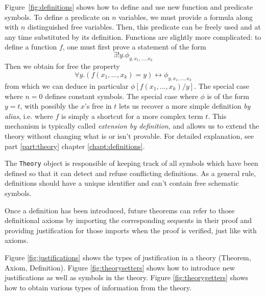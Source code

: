 Figure~\ref{fig:definitions} shows how to define and use new function and predicate symbols. To define a predicate on $n$ variables, we must provide a formula along with $n$ distinguished free variables. Then, this predicate can be freely used and at any time substituted by its definition. Functions are slightly more complicated: to define a function $f$, one must first prove a statement of the form 
$$\exists ! y. \phi_{y, x_1,...,x_k}$$
Then we obtain for free the property 
$$\forall y. (f(x_1,...,x_k)=y) \leftrightarrow \phi_{y, x_1,...,x_k}$$
from which we can deduce in particular $\phi[f(x_1,...,x_k)/y]$.
The special case where $n=0$ defines constant symbols. The special case where $\phi$ is of the form $y=t$, with possibly the $x$'s free in $t$ lets us recover a more simple definition \textit{by alias}, i.e. where  $f$ is simply a shortcut for a more complex term $t$.
This mechanism is typically called \textit{extension by definition}, and allows us to extend the theory without changing what is or isn't provable. For detailed explanation, see part \ref{part:theory} chapter \ref{chapt:definitions}.

The \lstinline{Theory}{} object is responsible of keeping track of all symbols which have been defined so that it can detect and refuse conflicting definitions. As a general rule, definitions should have a unique identifier and can't contain free schematic symbols.

Once a definition has been introduced, future theorems can refer to those definitional axioms by importing the corresponding sequents in their proof and providing justification for those imports when the proof is verified, just like with axioms.

Figure \ref{fig:justifications} shows the types of justification in a theory (Theorem, Axiom, Definition). Figure \ref{fig:theorysetters} shows how to introduce new justifications as well as symbols in the theory. Figure \ref{fig:theorygetters} shows how to obtain various types of information from the theory.



